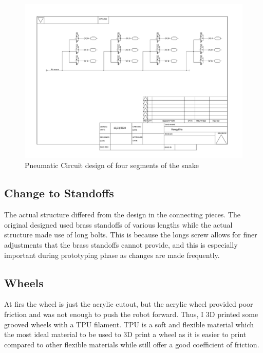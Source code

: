 \documentclass[twoside]{article}
\begin{document}
\begin{figure} [H]
	\centering
	\includegraphics[width=\linewidth]{pneumatic circuit design}
	\caption{Pneumatic Circuit design of four segments of the snake}
\end{figure}

\subsection{Change to Standoffs}
The actual structure differed from the design in the connecting pieces. The original designed used brass standoffs of various lengths while the actual structure made use of long bolts. This is because the longs screw allows for finer adjustments that the brass standoffs cannot provide, and this is especially important during prototyping phase as changes are made frequently. 

\subsection{Wheels}
At firs the wheel is just the acrylic cutout, but the acrylic wheel provided poor friction and was not enough to push the robot forward. Thus, I 3D printed some grooved wheels with a TPU filament. TPU is a soft and flexible material which the most ideal material to be used to 3D print a wheel as it is easier to print compared to other flexible materials while still offer a good coefficient of friction. 
\end{document}
